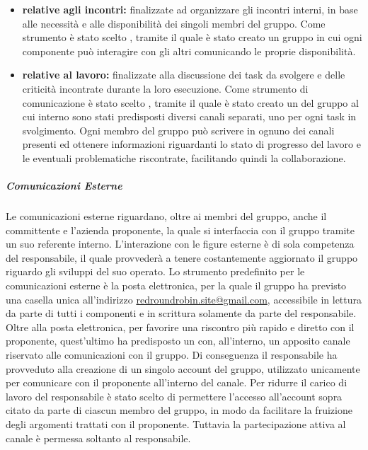				\begin{itemize}
					\item \textbf{relative agli incontri:} finalizzate ad organizzare gli incontri interni, in base alle necessità e alle disponibilità dei singoli membri del gruppo.
					\newline
					Come strumento è stato scelto , tramite il quale è stato creato un gruppo in cui ogni componente può interagire con gli altri comunicando le proprie disponibilità.
					\item \textbf{relative al lavoro:} finalizzate alla discussione dei task da svolgere e delle criticità incontrate durante la loro esecuzione.
					\newline
					Come strumento di comunicazione è stato scelto , tramite il quale è stato creato un  del gruppo al cui interno sono stati predisposti diversi canali separati, uno per ogni task in svolgimento. Ogni membro del gruppo può scrivere in ognuno dei canali presenti ed ottenere informazioni riguardanti lo stato di progresso del lavoro e le eventuali problematiche riscontrate, facilitando quindi la collaborazione.
				\end{itemize}
			
			\subparagraph{Comunicazioni Esterne}
			
				Le comunicazioni esterne riguardano, oltre ai membri del gruppo, anche il committente e l'azienda proponente, la quale si interfaccia con il gruppo tramite un suo referente interno. L'interazione con le figure esterne è di sola competenza del responsabile, il quale provvederà a tenere costantemente aggiornato il gruppo riguardo gli sviluppi del suo operato.
				\newline
				Lo strumento predefinito per le comunicazioni esterne è la posta elettronica, per la quale il gruppo ha previsto una casella unica all'indirizzo \href{mailto:redroundrobin.site@gmail.com}{redroundrobin.site@gmail.com}, accessibile in lettura da parte di tutti i componenti e in scrittura solamente da parte del responsabile.
				\newline
				Oltre alla posta elettronica, per favorire una riscontro più rapido e diretto con il proponente, quest'ultimo ha predisposto un   con, all'interno, un apposito canale riservato alle comunicazioni con il gruppo. Di conseguenza il responsabile ha provveduto alla creazione di un singolo account  del gruppo, utilizzato unicamente per comunicare con il proponente all'interno del canale. Per ridurre il carico di lavoro del responsabile è stato scelto di permettere l'accesso all'account sopra citato da parte di ciascun membro del gruppo, in modo da facilitare la fruizione degli argomenti trattati con il proponente. Tuttavia la partecipazione attiva al canale è permessa soltanto al responsabile.
						
